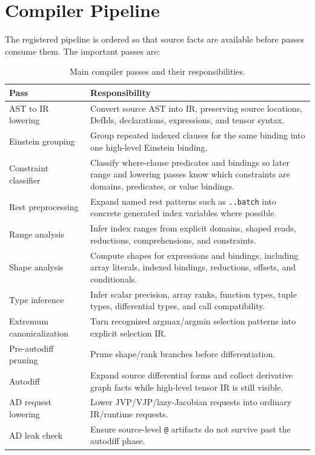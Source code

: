 \section{Compiler Pipeline}

The registered pipeline is ordered so that source facts are available before
passes consume them. The important passes are:

\begin{table}[p]
\centering
\caption{Main compiler passes and their responsibilities.}
\label{tab:pass-pipeline}
\renewcommand{\arraystretch}{1.08}
\small
\begin{tabular}{@{}L{0.32\textwidth}L{0.56\textwidth}@{}}
\toprule
Pass & Responsibility \\
\midrule
AST to IR lowering & Convert source AST into IR, preserving source locations, DefIds, declarations, expressions, and tensor syntax. \\
Einstein grouping & Group repeated indexed clauses for the same binding into one high-level Einstein binding. \\
Constraint classifier & Classify where-clause predicates and bindings so later range and lowering passes know which constraints are domains, predicates, or value bindings. \\
Rest preprocessing & Expand named rest patterns such as \texttt{..batch} into concrete generated index variables where possible. \\
Range analysis & Infer index ranges from explicit domains, shaped reads, reductions, comprehensions, and constraints. \\
Shape analysis & Compute shapes for expressions and bindings, including array literals, indexed bindings, reductions, offsets, and conditionals. \\
Type inference & Infer scalar precision, array ranks, function types, tuple types, differential types, and call compatibility. \\
Extremum canonicalization & Turn recognized argmax/argmin selection patterns into explicit selection IR. \\
Pre-autodiff pruning & Prune shape/rank branches before differentiation. \\
Autodiff & Expand source differential forms and collect derivative graph facts while high-level tensor IR is still visible. \\
AD request lowering & Lower JVP/VJP/lazy-Jacobian requests into ordinary IR/runtime requests. \\
AD leak check & Ensure source-level \texttt{@} artifacts do not survive past the autodiff phase. \\

\end{tabular}
\end{table}
